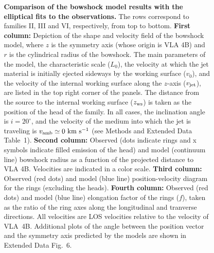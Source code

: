 \documentclass[12pt]{mythesis}
\begin{document}
\begin{figure}[p!]
\begin{center}
\caption[Comparison of the bowshock model results with the elliptical fits to the observations]{{\bf Comparison of the bowshock model results with the elliptical fits to the observations.} 
The rows correspond to families II, III and VI, respectively, from top to bottom. 
{\bf First column:} Depiction of the shape and velocity field of the bowshock model, where $z$ is the symmetry axis (whose origin is VLA 4B) and $r$ is the cylindrical radius of the bowshock. The main parameters of the model, the characteristic scale ($L_0$), the velocity at which the jet material is initially ejected sideways by the working surface ($v_0$), and the velocity of the internal working surface along the $z$-axis ($v_{\rm jet}$), are listed in the top right corner of the panels. The distance from the source to the internal working surface ($z_{\rm ws}$) is taken as the position of the head of the family.
In all cases, the inclination angle is $i=20^\circ$, and the velocity of the medium into which the jet is traveling is $v_{\rm amb}\simeq0~\mbox{km s$^{-1}$}$ (see Methods and Extended Data Table~1).
{\bf Second column:} Observed (dots indicate rings and x symbols indicate filled emission of the head) and model (continuum line) bowshock radius as a function of the projected distance to VLA 4B. Velocities are indicated in a color scale. 
{\bf Third column:} Observed (red dots) and model (blue line) position-velocity diagram for the rings (excluding the heads).
{\bf Fourth column:} Observed (red dots) and model (blue line) elongation factor of the rings ($f$), taken as the ratio of the ring axes along the longitudinal and tranverse directions.
All velocities are LOS velocities relative to the velocity of VLA~4B.
 Additional plots of the angle between the position vector and the symmetry axis predicted by the models are shown in Extended Data Fig.~6. 
 \label{fig:modeleli}} %
\end{center}
 \end{figure}
\end{document}
